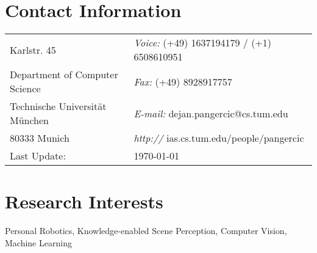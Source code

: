 \documentclass[margin,line]{res}
\begin{document}
\begin{resume}
\section{\sc Contact Information}
\vspace{.05in}
\begin{tabular}{@{}p{2in}p{4in}}
Karlstr. 45              & {\it Voice:}  (+49) 1637194179 / (+1) 6508610951\\            
Department of Computer Science   & {\it Fax:}    (+49) 8928917757 \\         
Technische Universit\"at M\"unchen & {\it E-mail:}  dejan.pangercic@cs.tum.edu\\       
80333 Munich   & {\it http://} ias.cs.tum.edu/people/pangercic \\     
Last Update:   & \today \\     
\end{tabular}
\section{\sc Research Interests}
Personal Robotics, Knowledge-enabled Scene Perception, Computer Vision, 
Machine Learning

\end{resume}
\end{document}

